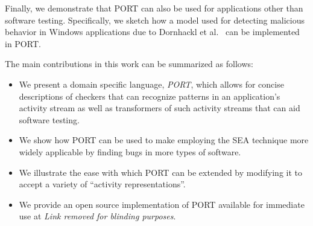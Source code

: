 Finally, we demonstrate that PORT can also be used for applications other than software testing.
Specifically, we sketch how a model used for
detecting malicious behavior in Windows applications due to Dornhackl et al.~\cite{Dornhackl2014} can be implemented in PORT.


The main contributions in this work can be summarized as follows:

\begin{itemize}

\item We present a domain specific language, {\em PORT},
  which allows for concise descriptions of checkers that can recognize patterns in
  an application's activity stream as well as transformers of such activity streams that can aid software testing.

\item We show how PORT can be used to make employing the SEA technique
  more widely applicable by finding bugs in more types of software.

\item We illustrate the ease with which PORT can be extended by modifying
  it to accept a variety of ``activity representations''.
  
\item We provide an open source implementation of PORT available for immediate use
at \textit{Link removed for blinding purposes}.

\end{itemize}


